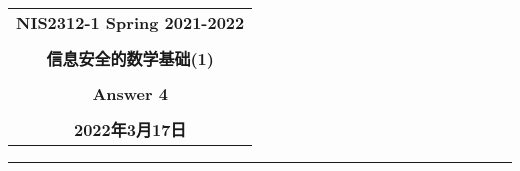 \documentclass[a4paper,12pt]{ctexart}
\begin{document}
  \begin{center}

  \vspace{-0.3in}
  \begin{tabular}{c}
    \textbf{\Large NIS2312-1 Spring 2021-2022} \\
    \textbf{\Large  } \\
    \textbf{\Large  信息安全的数学基础(1)} \\
    \textbf{\Large  } \\
    \textbf{\Large  Answer 4 } \\
    \textbf{\Large  } \\
    \textbf{\Large 2022年3月17日} \\
  \end{tabular}
  \end{center}
  \noindent
  \rule{\linewidth}{0.4pt}
\end{document}
